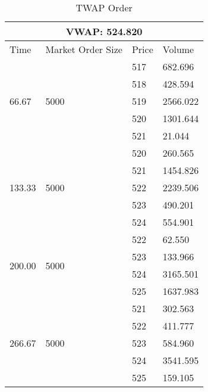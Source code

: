 \begin{table}[htbp]
\begin{center}
\caption{TWAP Order} \label{tab:twap_order}
\begin{tabular}{l|l|l|l}
\hline \hline
\multicolumn{4}{c}{VWAP: 524.820}                                      \\
\hline
Time                    & Market Order Size        & Price & Volume   \\
\hline
\multirow{5}{*}{66.67}  & \multirow{5}{*}{5000} & 517   & 682.696  \\
                        &                          & 518   & 428.594  \\
                        &                          & 519   & 2566.022 \\
                        &                          & 520   & 1301.644 \\
                        &                          & 521   & 21.044   \\
\hline                   
\multirow{5}{*}{133.33} & \multirow{5}{*}{5000} & 520   & 260.565  \\
                        &                          & 521   & 1454.826 \\
                        &                          & 522   & 2239.506 \\
                        &                          & 523   & 490.201  \\
                        &                          & 524   & 554.901  \\
\hline                            
\multirow{4}{*}{200.00} & \multirow{4}{*}{5000} & 522   & 62.550   \\
                        &                          & 523   & 133.966  \\
                        &                          & 524   & 3165.501 \\
                        &                          & 525   & 1637.983 \\
\hline                        
\multirow{5}{*}{266.67} & \multirow{5}{*}{5000} & 521   & 302.563  \\
                        &                          & 522   & 411.777  \\
                        &                          & 523   & 584.960  \\
                        &                          & 524   & 3541.595 \\
                        &                          & 525   & 159.105  \\

\end{tabular}
\end{center}
\end{table}
